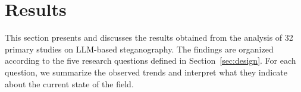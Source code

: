 \section{Results}
\label{sec:results}

This section presents and discusses the results obtained from the analysis of 32 primary studies on LLM-based steganography. The findings are organized according to the five research questions defined in Section~\ref{sec:design}. For each question, we summarize the observed trends and interpret what they indicate about the current state of the field.







% 
